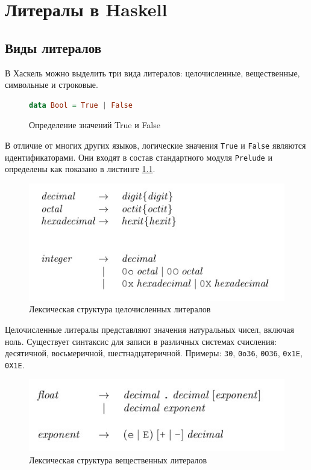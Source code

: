 \chapter{Литералы в Haskell}

\section{Виды литералов}

В Хаскель можно выделить три вида литералов: целочисленные, вещественные,
символьные и строковые.

\begin{figure}[H]
\label{bool}
\begin{lstlisting}[language=Haskell]
data Bool = True | False
\end{lstlisting}
\caption{Определение значений True и False}
\end{figure}

В отличие от многих других языков, логические значения \texttt{True} и
\texttt{False} являются идентификаторами. Они входят в состав стандартного
модуля \texttt{Prelude} и определены как показано в листинге \ref{bool}.

\begin{figure}[H]
\centering
\includegraphics[scale=0.66]{pic-integral-literals}
\caption{Лексическая структура целочисленных литералов}
\end{figure}

Целочисленные литералы представляют значения натуральных чисел, включая ноль.
Существует синтаксис для записи в различных системах счисления: десятичной,
восьмеричной, шестнадцатеричной. Примеры: \texttt{30}, \texttt{0o36},
\texttt{0O36}, \texttt{0x1E}, \texttt{0X1E}.

\begin{figure}[H]
\centering
\includegraphics[scale=0.66]{pic-rational-literals}
\caption{Лексическая структура вещественных литералов}
\end{figure}

